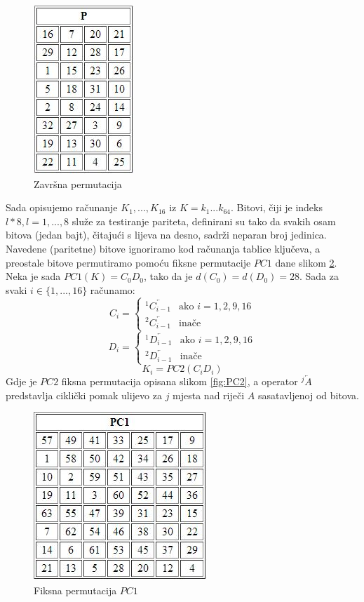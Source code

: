 \documentclass[a4paper,oneside,12pt]{memoir} %
\begin{document}
\begin{spacing}{1.5}
\begin{figure}[h]
\centering \includegraphics[scale=1]{P.jpg}
\caption{Završna permutacija}
\label{fig:permP}
\end{figure}

Sada opisujemo računanje $K_1,...,K_{16}$ iz $K=k_1...k_{64}$. Bitovi, čiji je indeks $l*8, l=1,...,8$ služe za testiranje pariteta, definirani su tako da svakih osam bitova (jedan bajt), čitajući s lijeva na desno, sadrži neparan broj jedinica. Navedene (paritetne) bitove ignoriramo kod računanja tablice ključeva, a preostale bitove permutiramo  pomoću fiksne permutacije $PC1$ dane slikom \ref{fig:PC1}. Neka je sada $PC1(K)=C_0D_0$, tako da je $d(C_0)=d(D_0)=28$. Sada za svaki $i \in \{1,...,16\}$ računamo:
\[C_i=\begin{cases}^1\overleftarrow{C_{i-1}} &\mbox{ako } i=1,2,9,16 \\  ^2\overleftarrow{C_{i-1}} &\mbox{inače } \end{cases}\]
\[D_i=\begin{cases}^1\overleftarrow{D_{i-1}} &\mbox{ako } i=1,2,9,16 \\  ^2\overleftarrow{D_{i-1}} &\mbox{inače } \end{cases}\]
\[K_i=PC2(C_iD_i)\]
Gdje je $PC2$ fiksna permutacija opisana slikom \ref{fig:PC2}, a operator $^j\overleftarrow{A}$ predstavlja ciklički pomak ulijevo za  $j$ mjesta nad riječi $A$ sasatavljenoj od bitova.
\begin{figure}[h]
\centering \includegraphics[scale=0.8]{PC1.jpg}
\caption{Fiksna permutacija $PC1$}
\label{fig:PC1}
\end{figure}


\end{spacing}
\end{document}
